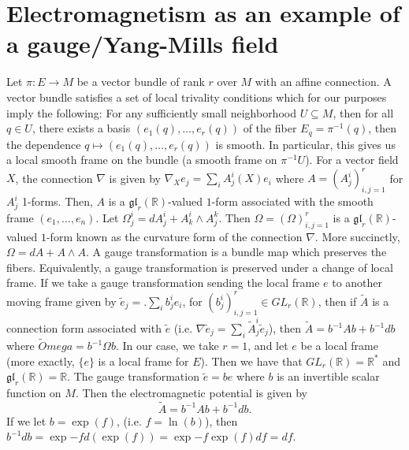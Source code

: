 \documentclass{article}
\newcommand{\R}{\mathbb R}
\newcommand{\nl}{\newline\newline\noindent}
\begin{document}
\section{Electromagnetism as an example of a gauge/Yang-Mills field}
Let $\pi:E\to M$ be a vector bundle of rank $r$ over $M$ with an affine connection. A vector bundle satisfies a set of local trivality conditions which for our purposes imply the following: For any sufficiently small neighborhood $U\subseteq M$, then for all $q\in U$, there exists a basis $(e_1(q),\dots, e_r(q))$ of the fiber $E_q = \pi^{-1}(q)$, then the dependence $q \mapsto (e_1(q),\dots, e_r(q))$ is smooth. In particular, this gives us a local smooth frame on the bundle (a smooth frame on $\pi^{-1}U$). For a vector field $X$, the connection $\nabla$ is given by $\nabla_X e_j = \sum_{i}A^i_j(X)e_i$ where $A = (A^i_j)_{i,j=1}^r$ for $A^i_j$ 1-forms. Then, $A$ is a $\mathfrak{gl}_r(\R)$-valued $1$-form associated with the smooth frame $(e_1,\dots,e_n)$. Let $\Omega^i_j = dA^i_j + A^i_k\wedge A^k_j$. Then $\Omega = (\Omega)_{i,j=1}^r$ is a $\mathfrak{gl}_r(\R)$-valued $1$-form known as the curvature form of the connection $\nabla$. More succinctly, $\Omega = dA + A\wedge A$. A gauge transformation is a bundle map which preserves the fibers. Equivalently, a gauge transformation is preserved under a change of local frame.
\nl
If we take a gauge transformation sending the local frame $e$ to another moving frame  given by $\tilde e_j =. \sum_i b_j^i e_i$, for $(b^i_j)_{i,j=1}^r\in GL_r(\R)$, then if $\tilde A$ is a connection form associated with $\tilde e$ (i.e. $\nabla \tilde e_j = \sum_i \tilde A^i_j \tilde e_j$), then $\tilde A = b^{-1}Ab + b^{-1} db$ where $\tilde Omega = b^{-1}\Omega b$.
\nl
In our case, we take $r = 1$, and let $e$ be a local frame (more exactly,  $\{e\}$ is a local frame for $E$). Then we have that $GL_r(\R) = \R^*$ and $\mathfrak{gl}_r(\R) = \R$. The gauge transformation $\tilde e = be$ where $b$ is an invertible scalar function on $M$. Then the electromagnetic potential is given by
\[\tilde A = b^{-1}Ab + b^{-1}db.\]
If we let $b = \exp(f)$, (i.e. $f = \ln(b)$), then $b^{-1}db = \exp{-f}d(\exp(f)) = \exp{-f}\exp(f)df  = df$.
\end{document}
